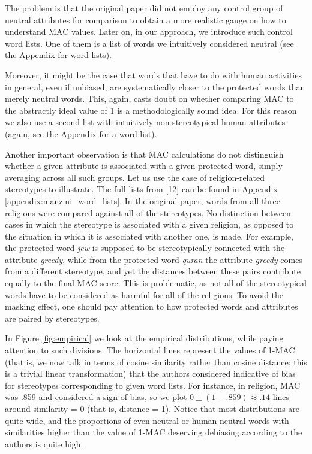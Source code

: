 \documentclass[
  12pt,
  dvipsnames,enabledeprecatedfontcommands]{scrartcl}
\begin{document}
The problem is that the original paper did not employ any control group
of neutral attributes for comparison to obtain a more realistic gauge on
how to understand \textsf{MAC} values. Later on, in our approach, we
introduce such control word lists. One of them is a list of words we
intuitively considered neutral (see the Appendix for word lists).

Moreover, it might be the case that words that have to do with human
activities in general, even if unbiased, are systematically closer to
the protected words than merely neutral words. This, again, casts doubt
on whether comparing \textsf{MAC} to the abstractly ideal value of 1 is
a methodologically sound idea. For this reason we also use a second list
with intuitively non-stereotypical human attributes (again, see the
Appendix for a word list).

Another important observation is that \textsf{MAC} calculations do not
distinguish whether a given attribute is associated with a given
protected word, simply averaging across all such groups. Let us use the
case of religion-related stereotypes to illustrate. The full lists from
{[}12{]} can be found in Appendix \ref{appendix:manzini_word_lists}. In
the original paper, words from all three religions were compared against
all of the stereotypes. No distinction between cases in which the
stereotype is associated with a given religion, as opposed to the
situation in which it is associated with another one, is made. For
example, the protected word \emph{jew} is supposed to be stereotypically
connected with the attribute \emph{greedy}, while from the protected
word \emph{quran} the attribute \emph{greedy} comes from a different
stereotype, and yet the distances between these pairs contribute equally
to the final \textsf{MAC} score. This is problematic, as not all of the
stereotypical words have to be considered as harmful for all of the
religions. To avoid the masking effect, one should pay attention to how
protected words and attributes are paired by stereotypes.

In Figure \ref{fig:empirical} we look at the empirical distributions,
while paying attention to such divisions. The horizontal lines represent
the values of 1-\textsf{MAC} (that is, we now talk in terms of cosine
similarity rather than cosine distance; this is a trivial linear
transformation) that the authors considered indicative of bias for
stereotypes corresponding to given word lists. For instance, in
religion, \textsf{MAC} was .859 and considered a sign of bias, so we
plot \(0\pm (1-.859)\approx .14\) lines around similarity = 0 (that is,
distance = 1). Notice that most distributions are quite wide, and the
proportions of even neutral or human neutral words with similarities
higher than the value of 1-\textsf{MAC} deserving debiasing according to
the authors is quite high.
\end{document}
